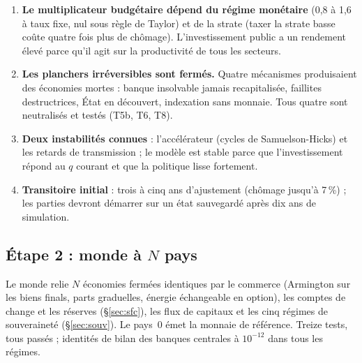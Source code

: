 \documentclass[11pt,a4paper]{article}
\begin{document}
\begin{enumerate}
\item \textbf{Le multiplicateur budgétaire dépend du régime monétaire} (0,8 à 1,6 à taux fixe, nul sous règle de Taylor) et de la strate (taxer la strate basse coûte quatre fois plus de chômage). L'investissement public a un rendement élevé parce qu'il agit sur la productivité de tous les secteurs.
\item \textbf{Les planchers irréversibles sont fermés.} Quatre mécanismes produisaient des économies mortes : banque insolvable jamais recapitalisée, faillites destructrices, État en découvert, indexation sans monnaie. Tous quatre sont neutralisés et testés (T5b, T6, T8).
\item \textbf{Deux instabilités connues} : l'accélérateur (cycles de Samuelson-Hicks) et les retards de transmission ; le modèle est stable parce que l'investissement répond au $q$ courant et que la politique lisse fortement.
\item \textbf{Transitoire initial} : trois à cinq ans d'ajustement (chômage jusqu'à 7\,\%) ; les parties devront démarrer sur un état sauvegardé après dix ans de simulation.
\end{enumerate}

\subsection{Étape 2 : monde à $N$ pays}
\label{sec:proto2}
Le monde relie $N$ économies fermées identiques par le commerce (Armington sur les biens finals, parts graduelles, énergie échangeable en option), les comptes de change et les réserves (\S\ref{sec:sfc}), les flux de capitaux et les cinq régimes de souveraineté (\S\ref{sec:souv}). Le pays~0 émet la monnaie de référence. Treize tests, tous passés ; identités de bilan des banques centrales à $10^{-12}$ dans tous les régimes.
\end{document}

